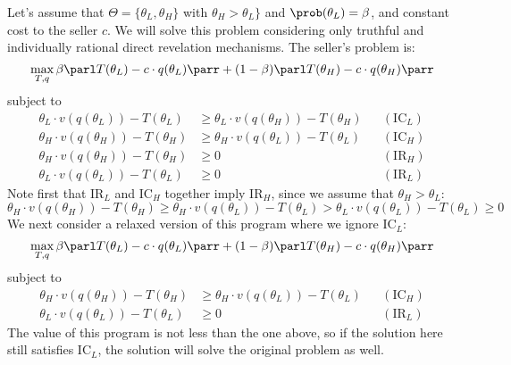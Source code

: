 \documentclass[10pt]{article}
\begin{document}
\begin{example}
	 Let's assume that $\Theta = \{\theta_L,\theta_H\}$ with $\theta_H > \theta_L\}$ and $\prob(\theta_L) = \beta$, and constant cost to the seller $c$. We will solve this problem considering only truthful and individually rational direct revelation mechanisms. The seller's problem is: \[\max_{T,q} \beta \parl T(\theta_L) - c\cdot q(\theta_L)\parr + (1-\beta)\parl T(\theta_H) - c\cdot q(\theta_H)\parr\]subject to \begin{align*} \theta_L \cdot v(q(\theta_L)) - T(\theta_L) &\ge \theta_L \cdot v(q(\theta_H)) - T(\theta_H) &&(\text{IC}_L) \\\theta_H \cdot v(q(\theta_H)) - T(\theta_H) &\ge \theta_H \cdot v(q(\theta_L)) - T(\theta_L) &&(\text{IC}_H) \\\theta_H \cdot v(q(\theta_H)) - T(\theta_H) &\ge 0 &&(\text{IR}_H) \\ \theta_L \cdot v(q(\theta_L)) - T(\theta_L) &\ge 0 &&(\text{IR}_L)\end{align*}Note first that IR$_L$ and IC$_H$ together imply IR$_H$, since we assume that $\theta_H > \theta_L$:\[\theta_H \cdot v(q(\theta_H)) - T(\theta_H) \ge \theta_H \cdot v(q(\theta_L)) - T(\theta_L) > \theta_L \cdot v(q(\theta_L)) - T(\theta_L) \ge 0\]We next consider a relaxed version of this program where we ignore IC$_L$:\[\max_{T,q} \beta \parl T(\theta_L) - c\cdot q(\theta_L)\parr + (1-\beta)\parl T(\theta_H) - c\cdot q(\theta_H)\parr\]subject to \begin{align*} \theta_H \cdot v(q(\theta_H)) - T(\theta_H) &\ge \theta_H \cdot v(q(\theta_L)) - T(\theta_L) &&(\text{IC}_H)  \\ \theta_L \cdot v(q(\theta_L)) - T(\theta_L) &\ge 0 &&(\text{IR}_L)\end{align*}The value of this program is not less than the one above, so if the solution here still satisfies IC$_L$, the solution will solve the original problem as well. 
	

\end{example}
\end{document}
